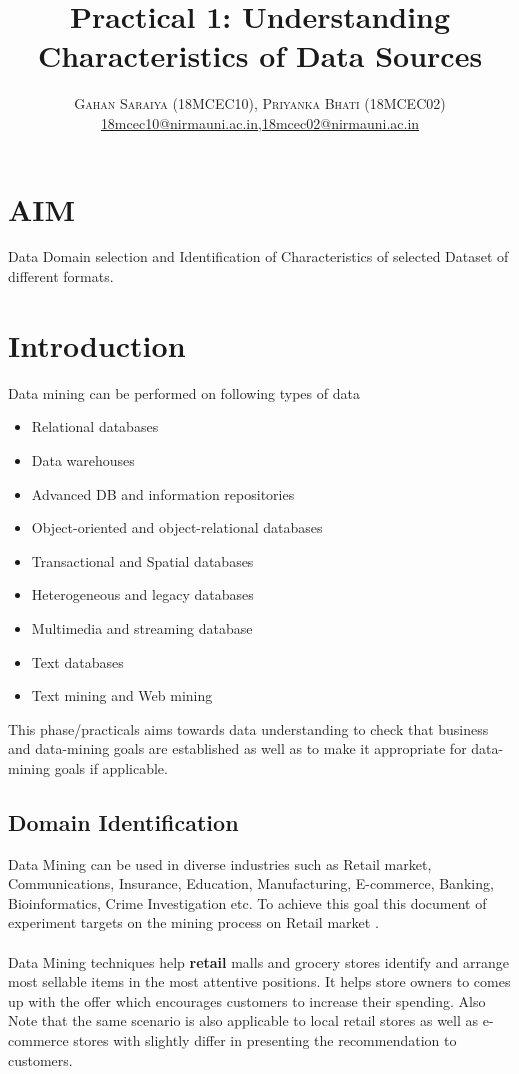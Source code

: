 \documentclass[paper=letter, fontsize=12pt]{article}
\title{\vspace{-15mm}\fontsize{24pt}{10pt}\selectfont\textbf{Practical 1: Understanding Characteristics of Data Sources}} %
\author{
\large
{\textsc{Gahan Saraiya (18MCEC10), Priyanka Bhati (18MCEC02) }}\\[2mm]
\normalsize \href{mailto:18mcec10@nirmauni.ac.in}{18mcec10@nirmauni.ac.in},\href{mailto:18mcec02@nirmauni.ac.in}{18mcec02@nirmauni.ac.in}\\[2mm] %
}
\date{}
\begin{document}
\maketitle %
\thispagestyle{fancy} %

\section{AIM}
Data Domain selection and Identification of Characteristics of selected Dataset of different formats.

\section{Introduction}
Data mining can be performed on following types of data 
\begin{itemize}
    \item Relational databases
    \item Data warehouses
    \item Advanced DB and information repositories
    \item Object-oriented and object-relational databases
    \item Transactional and Spatial databases
    \item Heterogeneous and legacy databases
    \item Multimedia and streaming database
    \item Text databases
    \item Text mining and Web mining 
\end{itemize}
This phase/practicals aims towards data understanding to check that business and data-mining goals are established as well as to make it appropriate for data-mining goals if applicable.

\subsection{Domain Identification}
Data Mining can be used in diverse industries such as Retail market, Communications, Insurance, Education, Manufacturing, E-commerce, Banking, Bioinformatics, Crime Investigation etc.
To achieve this goal this document of experiment targets on the mining process on Retail market .
\paragraph{} Data Mining techniques help \textbf{retail} malls and grocery stores identify and arrange most sellable items in the most attentive positions. It helps store owners to comes up with the offer which encourages customers to increase their spending. 
Also Note that the same scenario is also applicable to local retail stores as well as e-commerce stores with slightly differ in presenting the recommendation to customers.
\end{document}
